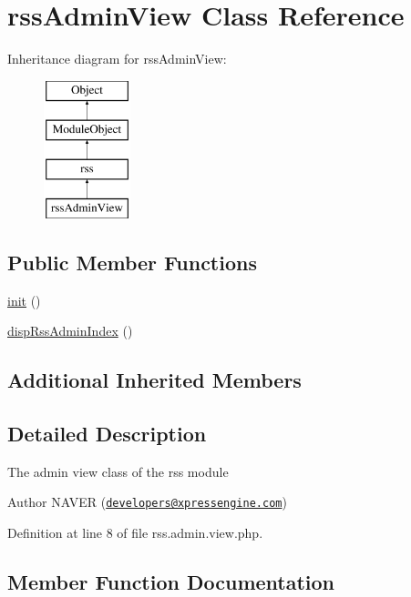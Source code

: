 \hypertarget{classrssAdminView}{}\section{rss\+Admin\+View Class Reference}
\label{classrssAdminView}
Inheritance diagram for rss\+Admin\+View\+:\begin{figure}[H]
\begin{center}
\leavevmode
\includegraphics[height=4.000000cm]{classrssAdminView}
\end{center}
\end{figure}
\subsection*{Public Member Functions}
\begin{DoxyCompactItemize}
\item 
\hyperlink{classrssAdminView_a36015edb6e131ff304bff9140cded3aa}{init} ()
\item 
\hyperlink{classrssAdminView_aaeb7ef076b1882f37d060fa2844035e9}{disp\+Rss\+Admin\+Index} ()
\end{DoxyCompactItemize}
\subsection*{Additional Inherited Members}


\subsection{Detailed Description}
The admin view class of the rss module

\begin{DoxyAuthor}{Author}
N\+A\+V\+ER (\href{mailto:developers@xpressengine.com}{\tt developers@xpressengine.\+com}) 
\end{DoxyAuthor}


Definition at line 8 of file rss.\+admin.\+view.\+php.



\subsection{Member Function Documentation}
\mbox{\label{classrssAdminView_aaeb7ef076b1882f37d060fa2844035e9}} 
